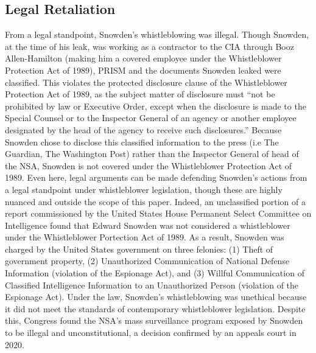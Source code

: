 \documentclass [12 pt] {article}
\begin{document}
\subsection {Legal Retaliation}
From a legal standpoint, Snowden's whistleblowing was illegal. Though Snowden, at the time of his leak, was working as a contractor to the CIA through Booz Allen-Hamilton (making him a covered employee under the Whistleblower Protection Act of 1989), PRISM and the documents Snowden leaked were classified. This violates the protected disclosure clause of the Whistleblower Protection Act of 1989, as the subject matter of disclosure must ``not be prohibited by law or Executive Order, except when the disclosure is made to the Special Counsel or to the Inspector General of an agency or another employee designated by the head of the agency to receive such disclosures.'' Because Snowden chose to disclose this classified information to the press (i.e The Guardian, The Washington Post) rather than the Inspector General of head of the NSA, Snowden is not covered under the Whistleblower Protection Act of 1989. Even here, legal arguments can be made defending Snowden's actions from a legal standpoint under whistleblower legislation, though these are highly nuanced and outside the scope of this paper. Indeed, an unclassified portion of a report commissioned by the United States House Permanent Select Committee on Intelligence found that Edward Snowden was not considered a whistleblower under the Whistleblower Portection Act of 1989.
\bigbreak
As a result, Snowden was charged by the United States government on three felonies: (1) Theft of government property, (2) Unauthorized Communication of National Defense Information (violation of the Espionage Act), and (3) Willful Communication of Classified Intelligence Information to an Unauthorized Person (violation of the Espionage Act). Under the law, Snowden's whistleblowing was unethical because it did not meet the standards of contemporary whistleblower legislation. Despite this, Congress found the NSA's mass surveillance program exposed by Snowden to be illegal and unconstitutional, a decision confirmed by an appeals court in 2020. 
\end{document}
